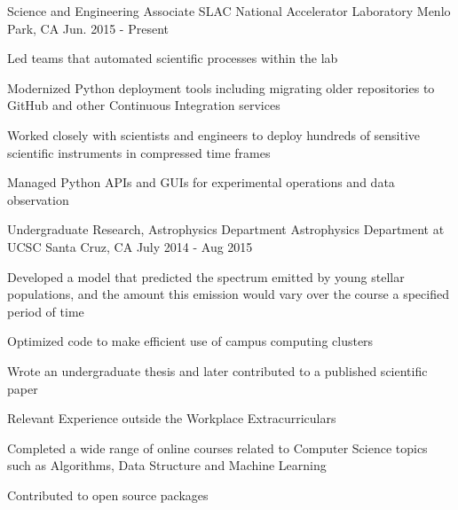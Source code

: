 \begin{cventries}
  \cventry
    {Science and Engineering Associate}
    {SLAC National Accelerator Laboratory}
    {Menlo Park, CA}
    {Jun. 2015 - Present}
    {
      \begin{cvitems}
        \item {Led teams that automated scientific processes within the lab}
        \item {Modernized Python deployment tools including migrating older
               repositories to GitHub and other Continuous Integration
               services}
        \item {Worked closely with scientists and engineers to deploy hundreds
               of sensitive scientific instruments in compressed time frames}
        \item {Managed Python APIs and GUIs for experimental operations and
               data observation} 
    \end{cvitems}
    }
  \cventry
    {Undergraduate Research, Astrophysics Department}
    {Astrophysics Department at UCSC}
    {Santa Cruz, CA}
    {July 2014 - Aug 2015}
    {
      \begin{cvitems}
        \item {Developed a model that predicted the spectrum emitted by young
               stellar populations, and the amount this emission would vary
               over the course a specified period of time}
        \item {Optimized code to make efficient use of campus computing
               clusters}
        \item {Wrote an undergraduate thesis and later contributed to a
               published scientific paper}
      \end{cvitems}
      }
  \cventry
    {Relevant Experience outside the Workplace}
    {Extracurriculars}
    {}
    {}
    {
      \begin{cvitems}
        \item {Completed a wide range of online courses related to Computer
               Science topics such as Algorithms, Data Structure and Machine
               Learning}
        \item {Contributed to open source packages}
      \end{cvitems}
      }
\end{cventries}
